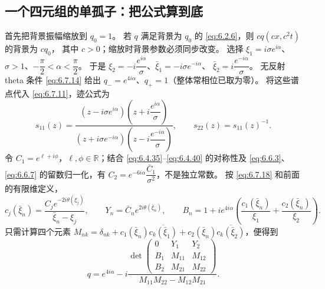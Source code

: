 \documentclass[lang=cn,scheme=chinese,mode=simple,device=normal,color=blue,
math=cm,thmcnt=section,12pt]{elegantbook}
\newcommand{\conj}[1]{\overline{#1}}
\newcommand{\eqq}[2]{\tag{#1}\label{eq:#1}#2}
\begin{document}
\subsection{一个四元组的单孤子：把公式算到底}
首先把背景振幅缩放到 $q_0=1$。
若 $q$ 满足背景为 $q_0$ 的 \eqref{eq:6.2.6}，则 $cq(cx,c^2t)$ 的背景为 $cq_0$，
其中 $c>0$；缩放时背景参数必须同步改变。
选择
$\xi_1=i\sigma e^{i\alpha}$、$\sigma>1$、$-\dfrac{\pi}{2}<\alpha<\dfrac{\pi}{2}$。
于是 $\xi_2=-i\dfrac{e^{i\alpha}}{\sigma}$、$\bar\xi_1=-i\sigma e^{-i\alpha}$、
$\bar\xi_2=i\dfrac{e^{-i\alpha}}{\sigma}$。
无反射 theta 条件 \eqref{eq:6.7.14} 给出 $q_-=e^{4i\alpha}$、$q_+=1$（整体常相位已取为零）。
将这些谱点代入 \eqref{eq:6.7.11}，迹公式为
\[
    s_{11}(z)=\dfrac{(z-i\sigma e^{i\alpha})(z+i\dfrac{e^{i\alpha}}{\sigma})}
    {(z+i\sigma e^{-i\alpha})(z-i\dfrac{e^{-i\alpha}}{\sigma})},\qquad s_{22}(z)=s_{11}(z)^{-1}.
\]
令 $C_1=e^{\ell+i\phi}$，$\ell,\phi\in\mathbb R$；结合 \eqref{eq:6.4.35}--\eqref{eq:6.4.40} 的对称性及 \eqref{eq:6.6.3}、\eqref{eq:6.6.7} 的留数归一化，有
$C_2=e^{-6i\alpha}\dfrac{\bar C_1}{\sigma^2}$，不是独立常数。
按 \eqref{eq:6.7.18} 和前面的有限维定义，
\[
    c_j(\bar\xi_n)=\dfrac{C_je^{-2i\theta(\xi_j)}}{\bar\xi_n-\xi_j},\qquad
    Y_n=\bar C_ne^{2i\theta(\bar\xi_n)},\qquad
    B_n=1+ie^{4i\alpha}\left(\dfrac{c_1(\bar\xi_n)}{\xi_1}+\dfrac{c_2(\bar\xi_n)}{\xi_2}\right).
\]
只需计算四个元素
$M_{nk}=\delta_{nk}+c_1(\bar\xi_n)\conj{c_k(\bar\xi_1)}+c_2(\bar\xi_n)\conj{c_k(\bar\xi_2)}$，便得到
\begin{equation}
    \eqq{6.8.5}{q=e^{4i\alpha}-i
        \dfrac{\det\begin{pmatrix}0&Y_1&Y_2\\B_1&M_{11}&M_{12}\\B_2&M_{21}&M_{22}\end{pmatrix}}
        {M_{11}M_{22}-M_{12}M_{21}}.}
\end{equation}
\end{document}
